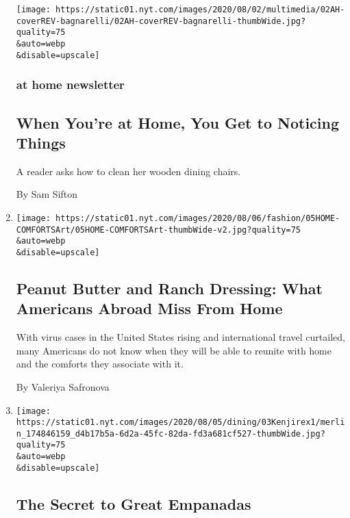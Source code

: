 \begin{enumerate}
  \texttt{[image: https://static01.nyt.com/images/2020/08/02/multimedia/02AH-coverREV-bagnarelli/02AH-coverREV-bagnarelli-thumbWide.jpg?quality=75\\\&auto=webp\\\&disable=upscale]}

  \hypertarget{at-home-newsletter-1}{%
  \subsubsection{at home newsletter}\label{at-home-newsletter-1}}

  \hypertarget{when-youre-at-home-you-get-to-noticing-things}{%
  \subsection{When You're at Home, You Get to Noticing
  Things}\label{when-youre-at-home-you-get-to-noticing-things}}

  A reader asks how to clean her wooden dining chairs.

  By Sam Sifton
\item
  \href{/2020/08/05/style/american-comfort-foods-peanut-butter-ranch-dressing-hot-cheetos.html}{}

  \texttt{[image: https://static01.nyt.com/images/2020/08/06/fashion/05HOME-COMFORTSArt/05HOME-COMFORTSArt-thumbWide-v2.jpg?quality=75\\\&auto=webp\\\&disable=upscale]}

  \hypertarget{peanut-butter-and-ranch-dressing-what-americans-abroad-miss-from-home}{%
  \subsection{Peanut Butter and Ranch Dressing: What Americans Abroad
  Miss From
  Home}\label{peanut-butter-and-ranch-dressing-what-americans-abroad-miss-from-home}}

  With virus cases in the United States rising and international travel
  curtailed, many Americans do not know when they will be able to
  reunite with home and the comforts they associate with it.

  By Valeriya Safronova
\item
  \href{/2020/08/05/dining/the-secret-to-great-empanadas.html}{}

  \texttt{[image: https://static01.nyt.com/images/2020/08/05/dining/03Kenjirex1/merlin\_174846159\_d4b17b5a-6d2a-45fc-82da-fd3a681cf527-thumbWide.jpg?quality=75\\\&auto=webp\\\&disable=upscale]}

  \hypertarget{the-secret-to-great-empanadas}{%
  \subsection{The Secret to Great
  Empanadas}\label{the-secret-to-great-empanadas}}


\end{enumerate}
